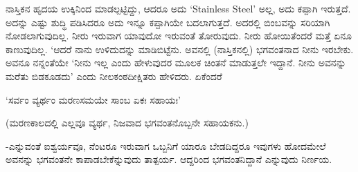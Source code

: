 ನಾಸ್ತಿಕನ ಹೃದಯ ಉಕ್ಕಿನಿಂದ ಮಾಡಲ್ಪಟ್ಟಿದ್ದು, ಆದರೂ ಅದು `{\eng Stainless Steel}' ಅಲ್ಲ, ಅದು ಕಪ್ಪಾಗಿ ಇರುತ್ತದೆ. ಅದನ್ನು ಎಷ್ಟು ಶುದ್ಧಿ ಪಡಿಸಿದರೂ ಅದು ಇನ್ನೂ ಕಪ್ಪಾಗಿಯೇ ಬದಲಾಗುತ್ತದೆ. ಅದರಲ್ಲಿ ಬಿಂಬವನ್ನು ಸರಿಯಾಗಿ ನೋಡಲಾಗುವುದಿಲ್ಲ. ನೀರು ಇರುವಾಗ ಯಾವುದೋ ಇರುವಂತೆ ತೋರುವುದು. ನೀರು ಹೋಯಿತೆಂದರೆ ಮತ್ತೆ ಏನೂ ಕಾಣುವುದಿಲ್ಲ. `ಆದರೆ ನಾನು ಉಳಿದುದನ್ನು ಮಾಡಿಬಿಟ್ಟೆನು. ಅವನಲ್ಲಿ (ನಾಸ್ತಿಕನಲ್ಲಿ) ಭಗವಂತನಾದ ನೀನು ಇರಬೇಕು. ಅವನೂ ನನ್ನಂತೆಯೇ `ನೀನು ಇಲ್ಲ ಎಂದು ಹೇಳುವುದರ ಮೂಲಕ ಚಿಂತನೆ ಮಾಡುತ್ತಲೇ ಇದ್ದಾನೆ. ನೀನು ಅವನನ್ನು ಮರೆತು ಬಿಡಕೂಡದು' ಎಂದು ನೀಲಕಂಠದೀಕ್ಷಿತರು ಹೇಳಿದರು. ಏಕೆಂದರೆ

\begin{shloka}
`ಸರ್ವಂ ವ್ಯರ್ಥಂ ಮರಣಸಮಯೇ ಸಾಂಬ ಏಕಃ ಸಹಾಯಃ'
\end{shloka}

(ಮರಣಕಾಲದಲ್ಲಿ ಎಲ್ಲವೂ ವ್ಯರ್ಥ, ನಿಜವಾದ ಭಗವಂತನೊಬ್ಬನೇ ಸಹಾಯಕನು.)

-ಎನ್ನುವಂತೆ ಐಶ್ವರ್ಯವೂ, ನೆಂಟರೂ ಇರುವಾಗ ಒಬ್ಬನಿಗೆ ಯಾರೂ ಬೇಡದಿದ್ದರೂ ಇವುಗಳು ಹೋದಮೇಲೆ ಅವನನ್ನು ಭಗವಂತನೇ ಕಾಪಾಡಬೇಕೆನ್ನುವುದು ತಾತ್ಪರ್ಯ. ಆದ್ದರಿಂದ ಭಗವಂತನಿದ್ದಾನೆ ಎನ್ನುವುದು ನಿರ್ಣಯ.












































































